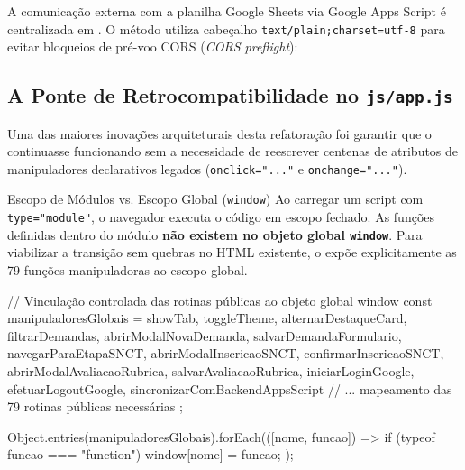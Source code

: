 A comunicação externa com a planilha Google Sheets via Google Apps Script é centralizada em . O método utiliza cabeçalho \texttt{text/plain;charset=utf-8} para evitar bloqueios de pré-voo CORS (\textit{CORS preflight}):


\subsection{A Ponte de Retrocompatibilidade no \texttt{js/app.js}}

Uma das maiores inovações arquiteturais desta refatoração foi garantir que o  continuasse funcionando sem a necessidade de reescrever centenas de atributos de manipuladores declarativos legados (\texttt{onclick="..."} e \texttt{onchange="..."}).

\begin{conceito}{Escopo de Módulos vs. Escopo Global (\texttt{window})}
Ao carregar um script com \texttt{type="module"}, o navegador executa o código em escopo fechado. As funções definidas dentro do módulo \textbf{não existem no objeto global \texttt{window}}. Para viabilizar a transição sem quebras no HTML existente, o  expõe explicitamente as 79 funções manipuladoras ao escopo global.
\end{conceito}

\begin{boxCodigoJS}[js/app.js]
// Vinculação controlada das rotinas públicas ao objeto global window
const manipuladoresGlobais = {
  showTab, toggleTheme, alternarDestaqueCard,
  filtrarDemandas, abrirModalNovaDemanda, salvarDemandaFormulario,
  navegarParaEtapaSNCT, abrirModalInscricaoSNCT, confirmarInscricaoSNCT,
  abrirModalAvaliacaoRubrica, salvarAvaliacaoRubrica,
  iniciarLoginGoogle, efetuarLogoutGoogle, sincronizarComBackendAppsScript
  // ... mapeamento das 79 rotinas públicas necessárias
};

Object.entries(manipuladoresGlobais).forEach(([nome, funcao]) => {
  if (typeof funcao === "function") {
    window[nome] = funcao;
  }
});
\end{boxCodigoJS}

